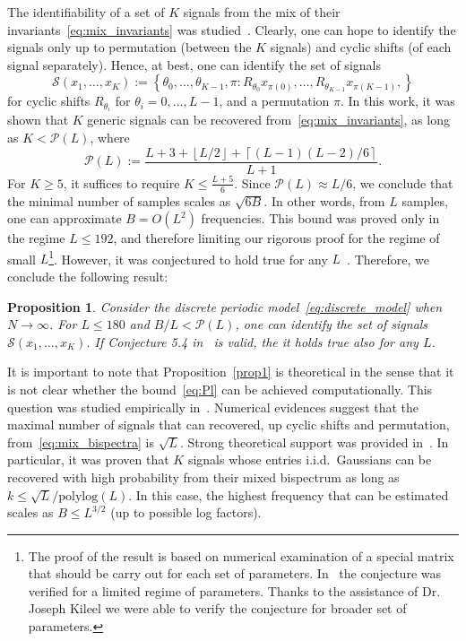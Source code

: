 \documentclass[english,12pt]{article}
\newcommand{\TODO}[1]{{\color{red}{[#1]}}}
\numberwithin{equation}{section}
\numberwithin{thm}{section} %
\newtheorem{prop}[thm]{Proposition}
\begin{document}
The identifiability of a set of $K$ signals from the mix of their  invariants~\eqref{eq:mix_invariants} was studied~\cite{bandeira2017estimation}.
Clearly, one can hope to identify the signals only up  to permutation (between the $K$ signals) and cyclic shifts (of each signal separately). 
Hence, at best, one can identify the set of signals  
\begin{equation} \label{eq:setS}
\mathcal{S}(x_1,\ldots,x_K):=\left\{ \theta_0,\ldots,\theta_{K-1},\pi : R_{\theta_0}x_{\pi(0)}, \ldots,R_{\theta_{K-1}}x_{\pi(K-1)},
\right\}
\end{equation}
for cyclic shifts $R_{\theta_i}$ for $\theta_i=0,\ldots,L-1$, and a permutation $\pi$.
In this work, it was shown that $K$ generic signals can be recovered from~\eqref{eq:mix_invariants},  as long as $K<\mathcal{P}(L)$, where
\begin{equation} \label{eq:Pl}
\mathcal{P}(L) := \frac{L+3+\left\lfloor L/2\right\rfloor +  \left\lceil (L-1)(L-2)/6\right\rceil}{L+1}.
\end{equation}
For $K\geq 5$, it suffices to require $K\leq \frac{L+5}{6}$. 
Since $\mathcal{P}(L) \approx L/6$, we conclude that the minimal number of samples scales as $\sqrt{6B}$. In other words, from $L$ samples, one can approximate  $B=O(L^2)$ frequencies. 
This bound was proved only in the regime $L\leq 192$, and therefore limiting our rigorous proof for the regime of small $L$\footnote{The proof of the result is based on numerical examination of a special matrix that should be carry out for each set of parameters. In~\cite{bandeira2017estimation} the conjecture was verified for a limited regime of parameters. Thanks to the assistance of Dr. Joseph Kileel we were able to verify the conjecture for broader set of parameters.}. 
However, it was conjectured  to hold true for any $L$~\cite[Conjecture 5.4]{bandeira2017estimation}.
Therefore, we conclude the following result:
\begin{prop} \label{prop1}
Consider the  discrete periodic model~\eqref{eq:discrete_model} when $N\to\infty$. 
For $L\leq 180$ and  $B/L<\mathcal{P}(L)$, one can identify the set of signals $\mathcal{S}(x_1,\ldots,x_K)$.
If Conjecture 5.4 in~\cite{bandeira2017estimation} is valid, the it holds true also for any $L$.
\end{prop}	

It is important to note that Proposition~\eqref{prop1} is theoretical in the sense that it is not clear whether the bound~\eqref{eq:Pl} can be achieved computationally.  
This question was studied empirically in~\cite{boumal2018heterogeneous}. Numerical evidences suggest that the maximal number of signals that can recovered, up cyclic shifts and permutation, from~\eqref{eq:mix_bispectra} is $\sqrt{L}$. 
Strong theoretical support was provided in~\cite{weinthesis}. In particular,  it was proven that $K$ signals whose entries i.i.d.\ Gaussians can be recovered with high probability from their mixed bispectrum as long as $k\leq \sqrt{L}/\text{polylog}(L)$.
In this case, the highest frequency that can be estimated scales as $B\leq L^{3/2}$ (up to possible log factors). 
\TODO{This is true for signals with white spectrum... for our case the bound seems smaller since the signals are smooth}
\end{document}

